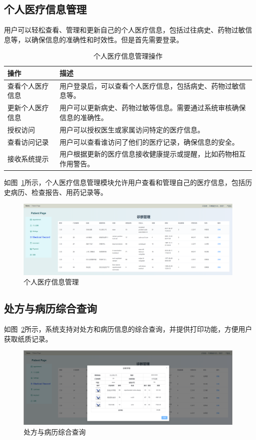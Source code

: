 \subsection{个人医疗信息管理}
用户可以轻松查看、管理和更新自己的个人医疗信息，包括过往病史、药物过敏信息等，以确保信息的准确性和时效性。但是首先需要登录。
\begin{table}[htbp]
	\centering
	\begin{tabular}{|p{6cm}|p{6cm}|}
		\hline
		\textbf{操作} & \textbf{描述} \\
		\hline
		查看个人医疗信息 & 用户登录后，可以查看个人医疗信息，包括病史、药物过敏信息等。 \\
		更新个人医疗信息 & 用户可以更新病史、药物过敏等信息。需要通过系统审核确保信息的准确性。 \\
		授权访问 & 用户可以授权医生或家属访问特定的医疗信息。 \\
		查看访问记录 & 用户可以查看谁访问了他们的医疗记录，确保信息的安全。 \\
		接收系统提示 & 用户根据更新的医疗信息接收健康提示或提醒，比如药物相互作用警告。 \\
		\hline
	\end{tabular}
	\caption{个人医疗信息管理操作}
\end{table}
如图~\ref{a11}所示，个人医疗信息管理模块允许用户查看和管理自己的医疗信息，包括历史病历、检查报告、用药记录等。
\begin{figure}[!h]
	\centering
	\includegraphics[width=\textwidth]{figures/a11.png}
	\caption{个人医疗信息管理}
	\label{a11}
\end{figure}


\subsection{处方与病历综合查询}
如图~\ref{a12}所示，系统支持对处方和病历信息的综合查询，并提供打印功能，方便用户获取纸质记录。
\begin{figure}[!h]
	\centering
	\includegraphics[width=\textwidth]{figures/a12.png}
	\caption{处方与病历综合查询}
	\label{a12}
\end{figure}


